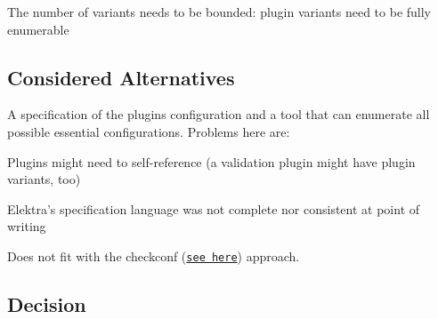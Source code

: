 \begin{DoxyItemize}
\item The number of variants needs to be bounded\+: plugin variants need to be fully enumerable
\end{DoxyItemize}

\subsection*{Considered Alternatives}

A specification of the plugin\textquotesingle{}s configuration and a tool that can enumerate all possible essential configurations. Problems here are\+:


\begin{DoxyItemize}
\item Plugins might need to self-\/reference (a validation plugin might have plugin variants, too)
\item Elektra’s specification language was not complete nor consistent at point of writing
\item Does not fit with the {\ttfamily checkconf} (\href{https://git.libelektra.org/issues/559}{\tt see here}) approach.
\end{DoxyItemize}

\subsection*{Decision}


